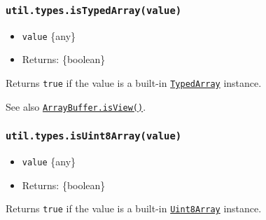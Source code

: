 \subsubsection{\texorpdfstring{\texttt{util.types.isTypedArray(value)}}{util.types.isTypedArray(value)}}\label{util.types.istypedarrayvalue}

\begin{itemize}
\tightlist
\item
  \texttt{value} \{any\}
\item
  Returns: \{boolean\}
\end{itemize}

Returns \texttt{true} if the value is a built-in
\href{https://developer.mozilla.org/en-US/docs/Web/JavaScript/Reference/Global_Objects/TypedArray}{\texttt{TypedArray}}
instance.

\begin{Shaded}
\begin{Highlighting}[]
\NormalTok{(} \NormalTok{())}\OperatorTok{;}  
\NormalTok{(} \NormalTok{())}\OperatorTok{;}  
\NormalTok{(} \NormalTok{())}\OperatorTok{;}  
\end{Highlighting}
\end{Shaded}

See also
\href{https://developer.mozilla.org/en-US/docs/Web/JavaScript/Reference/Global_Objects/ArrayBuffer/isView}{\texttt{ArrayBuffer.isView()}}.

\subsubsection{\texorpdfstring{\texttt{util.types.isUint8Array(value)}}{util.types.isUint8Array(value)}}\label{util.types.isuint8arrayvalue}

\begin{itemize}
\tightlist
\item
  \texttt{value} \{any\}
\item
  Returns: \{boolean\}
\end{itemize}

Returns \texttt{true} if the value is a built-in
\href{https://developer.mozilla.org/en-US/docs/Web/JavaScript/Reference/Global_Objects/Uint8Array}{\texttt{Uint8Array}}
instance.

